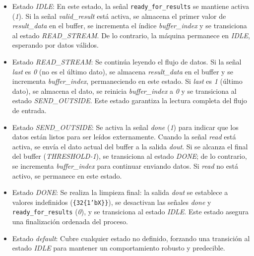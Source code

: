 \begin{itemize}
    \item Estado \emph{IDLE}: En este estado, la señal \texttt{ready\_for\_results} se mantiene activa (\emph{1}). Si la señal \emph{valid\_result} está activa, se almacena el primer valor de \emph{result\_data} en el buffer, se incrementa el índice \emph{buffer\_index} y se transiciona al estado \emph{READ\_STREAM}. De lo contrario, la máquina permanece en \emph{IDLE}, esperando por datos válidos.
    \item Estado \emph{READ\_STREAM}: Se continúa leyendo el flujo de datos. Si la señal \emph{last} es \emph{0} (no es el último dato), se almacena \emph{result\_data} en el buffer y se incrementa \emph{buffer\_index}, permaneciendo en este estado. Si \emph{last} es \emph{1} (último dato), se almacena el dato, se reinicia \emph{buffer\_index} a \emph{0} y se transiciona al estado \emph{SEND\_OUTSIDE}. Este estado garantiza la lectura completa del flujo de entrada.
    \item Estado \emph{SEND\_OUTSIDE}: Se activa la señal \emph{done} (\emph{1}) para indicar que los datos están listos para ser leídos externamente. Cuando la señal \emph{read} está activa, se envía el dato actual del buffer a la salida \emph{dout}. Si se alcanza el final del buffer (\emph{THRESHOLD-1}), se transiciona al estado \emph{DONE}; de lo contrario, se incrementa \emph{buffer\_index} para continuar enviando datos. Si \emph{read} no está activo, se permanece en este estado.
    \item Estado \emph{DONE}: Se realiza la limpieza final: la salida \emph{dout} se establece a valores indefinidos (\texttt{\{32\{1'bX\}\}}), se desactivan las señales \emph{done} y \texttt{ready\_for\_results} (\emph{0}), y se transiciona al estado \emph{IDLE}. Este estado asegura una finalización ordenada del proceso.
    \item Estado \emph{default}: Cubre cualquier estado no definido, forzando una transición al estado \emph{IDLE} para mantener un comportamiento robusto y predecible.
\end{itemize}

